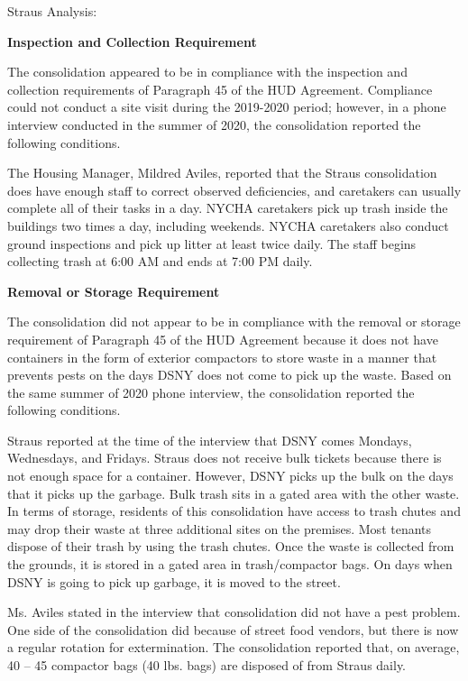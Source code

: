 Straus Analysis: 

\textbf{Inspection and Collection Requirement} 

 

The consolidation appeared to be in compliance with the inspection and collection requirements of Paragraph 45 of the HUD Agreement. Compliance could not conduct a site visit during the 2019-2020 period; however, in a phone interview conducted in the summer of 2020, the consolidation reported the following conditions.

The Housing Manager, Mildred Aviles, reported that the Straus consolidation does have enough staff to correct observed deficiencies, and caretakers can usually complete all of their tasks in a day. NYCHA caretakers pick up trash inside the buildings two times a day, including weekends. NYCHA caretakers also conduct ground inspections and pick up litter at least twice daily. The staff begins collecting trash at 6:00 AM and ends at 7:00 PM daily. 

\textbf{Removal or Storage Requirement} 

The consolidation did not appear to be in compliance with the removal or storage requirement of Paragraph  45 of the HUD Agreement because it does not have containers in the form of exterior compactors to store waste in a manner that prevents pests on the days DSNY does not come to pick up the waste. Based on the same summer of  2020  phone interview, the consolidation reported the following conditions.

  

Straus reported at the time of the interview that DSNY comes Mondays, Wednesdays, and Fridays. Straus does not receive bulk tickets because there is not enough space for a container. However, DSNY picks up the bulk on the days that it picks up the garbage. Bulk trash sits in a gated area with the other waste. In terms of storage, residents of this consolidation have access to trash chutes and may drop their waste at three additional sites on the premises. Most tenants dispose of their trash by using the trash chutes. Once the waste is collected from the grounds, it is stored in a gated area in trash/compactor bags. On days when DSNY is going to pick up garbage, it is moved to the street.

Ms. Aviles stated in the interview that consolidation did not have a pest problem. One side of the consolidation did because of street food vendors, but there is now a regular rotation for extermination. The consolidation reported that, on average, 40 -- 45 compactor bags (40 lbs. bags)  are disposed of from Straus daily.

